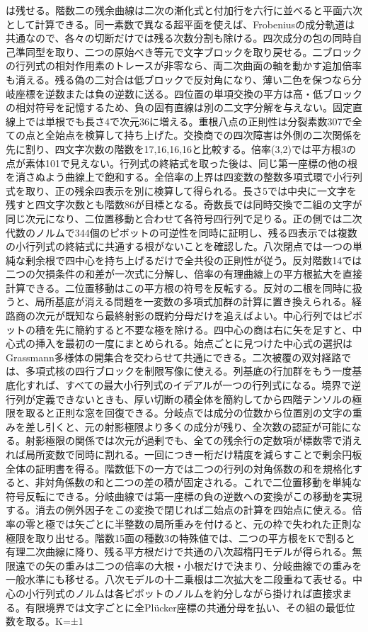 \documentclass[11pt,a4paper]{ltjsarticle}
\begin{document}
は残せる。階数二の残余曲線は二次の漸化式と付加行を六行に並べると平面六次として計算できる。同一素数で異なる超平面を使えば、Frobeniusの成分軌道は共通なので、各々の切断だけでは残る次数分割も除ける。四次成分の包の同時自己準同型を取り、二つの原始べき等元で文字ブロックを取り戻せる。二ブロックの行列式の相対作用素のトレースが非零なら、両二次曲面の軸を動かす追加倍率も消える。残る偽の二対合は低ブロックで反対角になり、薄い二色を保つなら分岐座標を逆数または負の逆数に送る。四位置の単項交換の平方は高・低ブロックの相対符号を記憶するため、負の固有直線は別の二文字分解を与えない。固定直線上では単根でも長さ4で次元36に増える。重根八点の正則性は分裂素数307で全ての点と全始点を検算して持ち上げた。交換商での四次障害は外側の二次関係を先に割り、四文字次数の階数を17,16,16,16と比較する。倍率(3,2)では平方根3の点が素体101で見えない。行列式の終結式を取った後は、同じ第一座標の他の根を消さぬよう曲線上で飽和する。全倍率の上界は四変数の整数多項式環で小行列式を取り、正の残余四表示を別に検算して得られる。長さ5では中央に一文字を残すと四文字次数とも階数86が目標となる。奇数長では同時交換で二組の文字が同じ次元になり、二位置移動と合わせて各符号四行列で足りる。正の側では二次代数のノルムで344個のピボットの可逆性を同時に証明し、残る四表示では複数の小行列式の終結式に共通する根がないことを確認した。八次閉点では一つの単純な剰余根で四中心を持ち上げるだけで全共役の正則性が従う。反対階数14では二つの欠損条件の和差が一次式に分解し、倍率の有理曲線上の平方根拡大を直接計算できる。二位置移動はこの平方根の符号を反転する。反対の二根を同時に扱うと、局所基底が消える問題を一変数の多項式加群の計算に置き換えられる。経路商の次元が既知なら最終射影の既約分母だけを追えばよい。中心行列ではピボットの積を先に簡約すると不要な極を除ける。四中心の商は右に矢を足すと、中心式の挿入を最初の一度にまとめられる。始点ごとに見つけた中心式の選択はGrassmann多様体の開集合を交わらせて共通にできる。二次被覆の双対経路では、多項式核の四行ブロックを制限写像に使える。列基底の行加群をもう一度基底化すれば、すべての最大小行列式のイデアルが一つの行列式になる。境界で逆行列が定義できないときも、厚い切断の積全体を簡約してから四階テンソルの極限を取ると正則な窓を回復できる。分岐点では成分の位数から位置別の文字の重みを差し引くと、元の射影極限より多くの成分が残り、全次数の認証が可能になる。射影極限の関係では次元が過剰でも、全ての残余行の定数項が標数零で消えれば局所変数で同時に割れる。一回につき一桁だけ精度を減らすことで剰余円板全体の証明書を得る。階数低下の一方では二つの行列の対角係数の和を規格化すると、非対角係数の和と二つの差の積が固定される。これで二位置移動を単純な符号反転にできる。分岐曲線では第一座標の負の逆数への変換がこの移動を実現する。消去の例外因子をこの変換で閉じれば二始点の計算を四始点に使える。倍率の零と極では矢ごとに半整数の局所重みを付けると、元の枠で失われた正則な極限を取り出せる。階数15面の種数3の特殊値では、二つの平方根をKで割ると有理二次曲線に降り、残る平方根だけで共通の八次超楕円モデルが得られる。無限遠での矢の重みは二つの倍率の大根・小根だけで決まり、分岐曲線での重みを一般水準にも移せる。八次モデルの十二乗根は二次拡大を二段重ねて表せる。中心の小行列式のノルムは各ピボットのノルムを約分しながら掛ければ直接求まる。有限境界では文字ごとに全Plücker座標の共通分母を払い、その組の最低位数を取る。K=±1 
\end{document}
